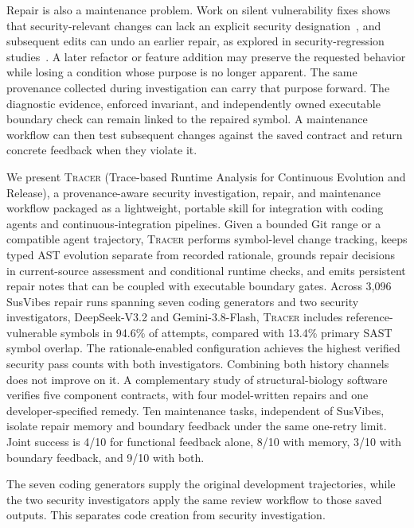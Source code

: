 \documentclass[10pt,conference]{IEEEtran}
\newcommand{\tracer}{\textsc{Tracer}}
\begin{document}
Repair is also a maintenance problem. Work on silent vulnerability fixes shows that security-relevant changes can lack an explicit security designation~\cite{colefunda}, and subsequent edits can undo an earlier repair, as explored in security-regression studies~\cite{undoingfix}. A later refactor or feature addition may preserve the requested behavior while losing a condition whose purpose is no longer apparent. The same provenance collected during investigation can carry that purpose forward. The diagnostic evidence, enforced invariant, and independently owned executable boundary check can remain linked to the repaired symbol. A maintenance workflow can then test subsequent changes against the saved contract and return concrete feedback when they violate it.

We present \tracer{} (Trace-based Runtime Analysis for Continuous Evolution and Release), a provenance-aware security investigation, repair, and maintenance workflow packaged as a lightweight, portable skill for integration with coding agents and continuous-integration pipelines. Given a bounded Git range or a compatible agent trajectory, \tracer{} performs symbol-level change tracking, keeps typed AST evolution separate from recorded rationale, grounds repair decisions in current-source assessment and conditional runtime checks, and emits persistent repair notes that can be coupled with executable boundary gates. Across 3,096 SusVibes repair runs spanning seven coding generators and two security investigators, DeepSeek-V3.2 and Gemini-3.8-Flash, \tracer{} includes reference-vulnerable symbols in 94.6\% of attempts, compared with 13.4\% primary SAST symbol overlap. The rationale-enabled configuration achieves the highest verified security pass counts with both investigators. Combining both history channels does not improve on it. A complementary study of structural-biology software~\cite{rfdiffusion,proteinmpnn,haddock3,dockq,vina,foldseek} verifies five component contracts, with four model-written repairs and one developer-specified remedy. Ten maintenance tasks, independent of SusVibes, isolate repair memory and boundary feedback under the same one-retry limit. Joint success is 4/10 for functional feedback alone, 8/10 with memory, 3/10 with boundary feedback, and 9/10 with both.

The seven coding generators supply the original development trajectories, while the two security investigators apply the same review workflow to those saved outputs. This separates code creation from security investigation.
\end{document}

